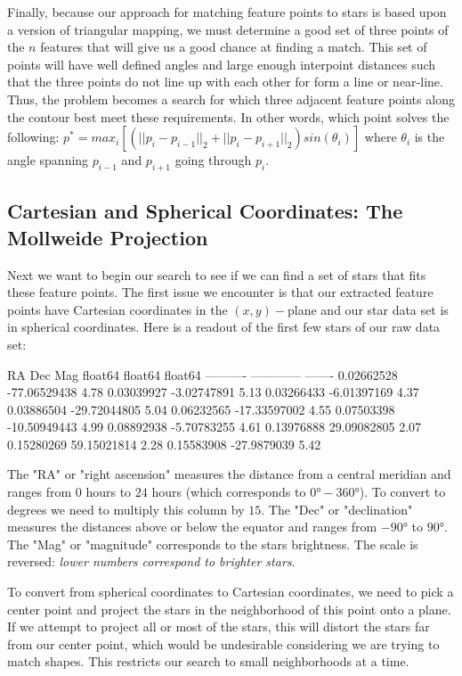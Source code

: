 \documentclass[paper=a4, fontsize=11pt]{scrartcl} %
\begin{document}
Finally, because our approach for matching feature points to stars is based upon a version of triangular mapping, we must determine a good set of three points of the $n$ features that will give us a good chance at finding a match. This set of points will have well defined angles and large enough interpoint distances such that the three points do not line up with each other for form a line or near-line. Thus, the problem becomes a search for which three adjacent feature points along the contour best meet these requirements. In other words, which point solves the following: $p^* = max_{i} [ (||p_i - p_{i-1}||_2 + ||p_i - p_{i+1}||_2) sin(\theta_i) ]$ where $\theta_i$ is the angle spanning $p_{i-1}$ and $p_{i+1}$ going through $p_i$. 


\subsection{Cartesian and Spherical Coordinates: The Mollweide Projection}
Next we want to begin our search to see if we can find a set of stars that fits these feature points. The first issue we encounter is that our extracted feature points have Cartesian coordinates in the $(x,y)-$plane and our star data set is in spherical coordinates. Here is a readout of the first few stars of our raw data set:
\begin{python}
	   RA         Dec        Mag  
	float64     float64    float64
	---------- ------------ -------
	0.02662528 -77.06529438    4.78
	0.03039927  -3.02747891    5.13
	0.03266433  -6.01397169    4.37
	0.03886504 -29.72044805    5.04
	0.06232565 -17.33597002    4.55
	0.07503398 -10.50949443    4.99
	0.08892938  -5.70783255    4.61
	0.13976888  29.09082805    2.07
	0.15280269  59.15021814    2.28
	0.15583908  -27.9879039    5.42
\end{python}
The "RA" or "right ascension" measures the distance from a central meridian and ranges from $0$ hours to $24$ hours (which corresponds to $0\si{\degree}-360\si{\degree}$). To convert to degrees we need to multiply this column by $15$.
The "Dec" or "declination" measures the distances above or below the equator and ranges from $-90\si{\degree}$ to $90\si{\degree}$. The "Mag" or "magnitude" corresponds to the stars brightness. The scale is reversed: \textit{lower numbers correspond to brighter stars}.

To convert from spherical coordinates to Cartesian coordinates, we need to pick a center point and project the stars in the neighborhood of this point onto a plane.  If we attempt to project all or most of the stars, this will distort the stars far from our center point, which would be undesirable considering we are trying to match shapes.  This restricts our search to small neighborhoods at a time.
\end{document}

